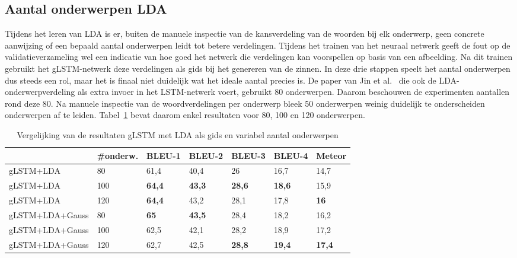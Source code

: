 \subsection{Aantal onderwerpen LDA}
Tijdens het leren van LDA is er, buiten de manuele inspectie van de kansverdeling van de woorden bij elk onderwerp, geen concrete aanwijzing of een bepaald aantal onderwerpen leidt tot betere verdelingen.
Tijdens het trainen van het neuraal netwerk geeft de fout op de validatieverzameling wel een indicatie van hoe goed het netwerk die verdelingen kan voorspellen op basis van een afbeelding.
Na dit trainen gebruikt het gLSTM-netwerk deze verdelingen als gids bij het genereren van de zinnen.
In deze drie stappen speelt het aantal onderwerpen dus steeds een rol, maar het is finaal niet duidelijk wat het ideale aantal precies is.
De paper van Jin et al.~\cite{Jin2015} die ook de LDA-onderwerpverdeling als extra invoer in het LSTM-netwerk voert, gebruikt 80 onderwerpen.
Daarom beschouwen de experimenten aantallen rond deze 80. Na manuele inspectie van de woordverdelingen per onderwerp bleek 50 onderwerpen weinig duidelijk te onderscheiden onderwerpen af te leiden.
Tabel~\ref{table:lda-onderwerpen} bevat daarom enkel resultaten voor 80, 100 en 120 onderwerpen.

    \begin{table}
    	\centering
    	\begin{tabular}{lllllll}
    		~                 &\#onderw.  & BLEU-1 & BLEU-2 & BLEU-3 & BLEU-4 & Meteor \\ \hline
    		gLSTM+LDA       & 80  & 61,4   & 40,4  & 26   & 16,7   & 14,7     \\ 
    		gLSTM+LDA      & 100  & \textbf{64,4}   & \textbf{43,3}   & \textbf{28,6}   & \textbf{18,6}   & 15,9  \\
    		gLSTM+LDA      &120   & \textbf{64,4}   & 43,2   & 28,1   & 17,8   & \textbf{16}  \\\hline
    		gLSTM+LDA+Gauss &80 & \textbf{65}   & \textbf{43,5}   & 28,4   & 18,2   & 16,2  \\ 
    		gLSTM+LDA+Gauss& 100&62,5& 42,1   & 28,2   & 18,9   & 17,2    \\
    	gLSTM+LDA+Gauss&120 & 62,7   & 42,5   &\textbf{28,8}   & \textbf{19,4}   & \textbf{17,4}  \\\hline
    	\end{tabular}
    	\caption{Vergelijking van de resultaten gLSTM met LDA als gids en variabel aantal onderwerpen}	
    	\label{table:lda-onderwerpen}
    \end{table}
    
